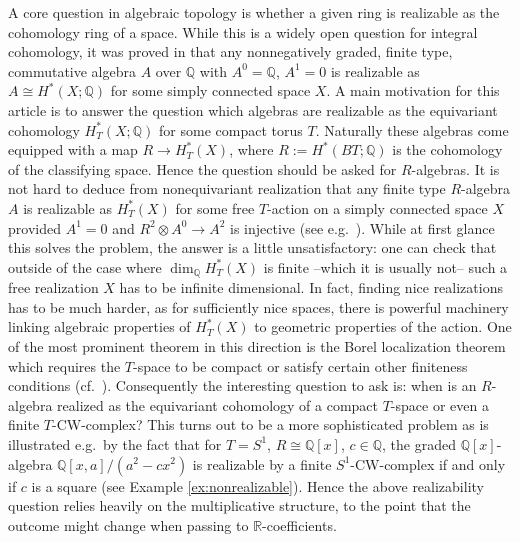 \documentclass[12pt,a4paper]{article}
\theoremstyle{definition}
\begin{document}
A core question in algebraic topology is whether a given ring is realizable as the cohomology ring of a space. While this is a widely open question for integral cohomology, it was proved in \cite{Quillen} that any nonnegatively graded, finite type, commutative algebra $A$ over $\mathbb{Q}$ with $A^0=\mathbb{Q}$, $A^1=0$ is realizable as $A\cong H^*(X;\mathbb{Q})$ for some simply connected space $X$. A main motivation for this article is to answer the question which algebras are realizable as the equivariant cohomology $H_T^*(X;\mathbb{Q})$ for some compact torus $T$. Naturally these algebras come equipped with a map $R\rightarrow H_T^*(X)$, where $R:=H^*(BT;\mathbb{Q})$ is the cohomology of the classifying space. Hence the question should be asked for $R$-algebras. It is not hard to deduce from nonequivariant realization that any finite type $R$-algebra $A$ is realizable as $H_T^*(X)$ for some free $T$-action on a simply connected space $X$ provided $A^1=0$ and $R^2\otimes A^0\rightarrow A^2$ is injective (see e.g.\ \cite[Proposition 4.2]{HalperinTori}). While at first glance this solves the problem, the answer is a little unsatisfactory: one can check that outside of the case where $\dim_\mathbb{Q}H_T^*(X)$ is finite --which it is usually not-- such a free realization $X$ has to be infinite dimensional. In fact, finding nice realizations has to be much harder, as for sufficiently nice spaces, there is powerful machinery linking algebraic properties of $H_T^*(X)$ to geometric properties of the action. One of the most prominent theorem in this direction is the Borel localization theorem which requires the $T$-space to be compact or satisfy certain other finiteness conditions (cf.\ \cite[Section 3.2]{AP}).
Consequently the interesting question to ask is: when is an $R$-algebra realized as the equivariant cohomology of a compact $T$-space or even a finite $T$-CW-complex? This turns out to be a more sophisticated problem as is illustrated e.g.\ by the fact that for $T=S^1$, $R\cong \mathbb{Q}[x]$, $c\in\mathbb{Q}$, the graded $\mathbb{Q}[x]$-algebra $\mathbb{Q}[x,a]/(a^2-cx^2)$ is realizable by a finite $S^1$-CW-complex if and only if $c$ is a square (see Example \ref{ex:nonrealizable}). Hence the above realizability question relies heavily on the multiplicative structure, to the point that the outcome might change when passing to $\mathbb{R}$-coefficients.
\end{document}

